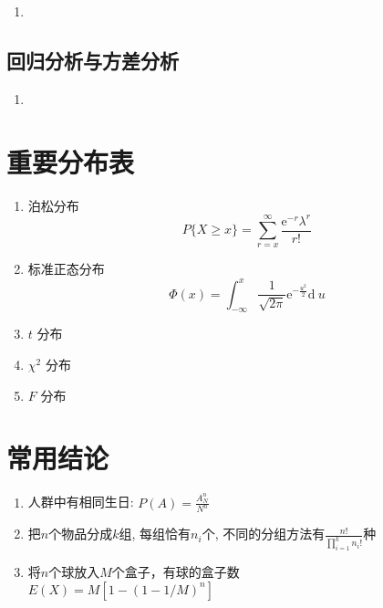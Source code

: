 \documentclass[10pt,a4paper,nofonts]{ctexart}
\newcommand{\D}{\displaystyle}
\renewcommand{\d}{{\mathrm{d}\:\!}}
\newcommand{\e}{{\mathrm{e}}}
\begin{document}
\begin{multicols}{2}
\begin{enumerate}
\item 
\end{enumerate}

\subsection{回归分析与方差分析}

\begin{enumerate}
\item 
\end{enumerate}

\section{重要分布表}

\begin{enumerate}
\item 泊松分布
$$P\{X\ge x\}=\sum_{r=x}^{\infty}\frac{\e^{-r}\lambda^r}{r!}$$
\item 标准正态分布
$$\varPhi(x)=\int_{-\infty}^{x}\frac{1}{\sqrt{2\pi}}\e^{-\frac{u^2}{2}}\d u$$
\item $t$ 分布
\item $\chi^2$ 分布
\item $F$ 分布

\end{enumerate}

\section{常用结论}

\begin{enumerate}
\item 人群中有相同生日: $\D P(A)=\frac{A_N^n}{N^n}$

\item 把$n$个物品分成$k$组, 每组恰有$n_i$个, 不同的分组方法有$\D\frac{n!}{\prod_{i=1}^{k}n_i!}$种

\item 将$n$个球放入$M$个盒子，有球的盒子数\\$E(X)=M\left[1-(1-1/M)^n\right]$

\end{enumerate}

\end{multicols}
\end{document}
